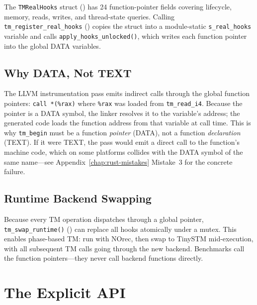 

The \texttt{TMRealHooks} struct ()
has 24 function-pointer fields covering lifecycle, memory, reads, writes,
and thread-state queries.  Calling \texttt{tm\_register\_real\_hooks}
() copies the struct
into a module-static \texttt{s\_real\_hooks} variable and calls
\texttt{apply\_hooks\_unlocked()}, which writes each function pointer
into the global DATA variables.

\subsection{Why DATA, Not TEXT}

The LLVM instrumentation pass emits indirect calls through the global
function pointers: \texttt{call *(\%rax)} where \texttt{\%rax} was loaded
from \texttt{tm\_read\_i4}.  Because the pointer is a DATA symbol, the
linker resolves it to the variable's address; the generated code loads
the function address from that variable at call time.  This is why
\texttt{tm\_begin} must be a function \emph{pointer} (DATA), not a
function \emph{declaration} (TEXT).  If it were TEXT, the pass would emit
a direct call to the function's machine code, which on some platforms
collides with the DATA symbol of the same name---see
Appendix~\ref{chap:rust-mistakes} Mistake~3 for the concrete failure.

\subsection{Runtime Backend Swapping}

Because every TM operation dispatches through a global pointer,
\texttt{tm\_swap\_runtime()} ()
can replace all hooks atomically under a mutex.  This enables
phase-based TM: run with NOrec, then swap to TinySTM mid-execution, with
all subsequent TM calls going through the new backend.  Benchmarks call
the function pointers---they never call backend functions directly.

\section{The Explicit API}
\label{sec:repo-explicit-api}

